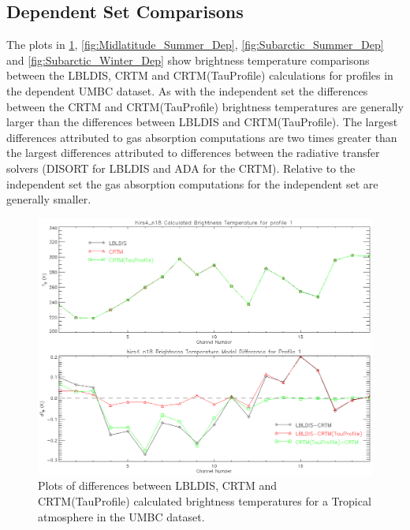 \subsection{Dependent Set Comparisons}

The plots in \ref{fig:Tropical_Dep}, \ref{fig:Midlatitude_Summer_Dep}, \ref{fig:Subarctic_Summer_Dep} and \ref{fig:Subarctic_Winter_Dep} show brightness temperature comparisons between the LBLDIS, CRTM and CRTM(TauProfile) calculations for profiles in the dependent UMBC dataset. As with the independent set the differences
between the CRTM and CRTM(TauProfile) brightness temperatures are generally larger than the differences between LBLDIS and CRTM(TauProfile). The largest differences
attributed to gas absorption computations are two times greater than the largest differences attributed to differences between the radiative transfer solvers (DISORT for LBLDIS and ADA for the CRTM). Relative to the independent set the gas absorption computations for the independent set are generally smaller. 

\begin{figure}[htp]
  \centering{}
  \includegraphics[scale=0.8]{./graphics/Tropical_01.eps}
  \caption{Plots of differences between LBLDIS, CRTM and CRTM(TauProfile) calculated brightness temperatures for
   a Tropical atmosphere in the UMBC dataset.}
  \label{fig:Tropical_Dep}
\end{figure}

